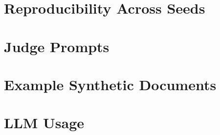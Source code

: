 \section{Reproducibility Across Seeds}
\label{app:reproducibility}


\section{Judge Prompts}
\label{app:evaluation}


\section{Example Synthetic Documents}
\label{app:example_SDF}


\section{LLM Usage}
\label{app:llm_usage}
